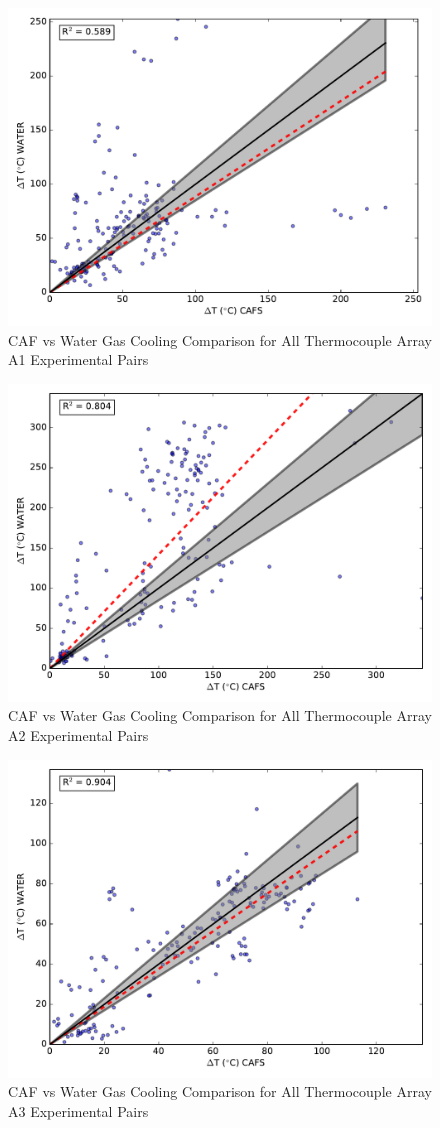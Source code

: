 \documentclass[12pt,oneside]{book}
\begin{document}
\begin{figure}[!ht]
	\includegraphics[width=.7\columnwidth]{../Figures/Gas_Cooling/Combined_A1_scatter}
	\caption{CAF vs Water Gas Cooling Comparison for All Thermocouple Array A1 Experimental Pairs}
	\label{fig:CAFS_Water_A1_all}
\end{figure}

\begin{figure}[!ht]
	\includegraphics[width=.7\columnwidth]{../Figures/Gas_Cooling/Combined_A2_scatter}
	\caption{CAF vs Water Gas Cooling Comparison for All Thermocouple Array A2 Experimental Pairs}
	\label{fig:CAFS_Water_A2_all}
\end{figure}

\begin{figure}[!ht]
	\includegraphics[width=.7\columnwidth]{../Figures/Gas_Cooling/Combined_A3_scatter}
	\caption{CAF vs Water Gas Cooling Comparison for All Thermocouple Array A3 Experimental Pairs}
	\label{fig:CAFS_Water_A3_all}
\end{figure}
\end{document}
